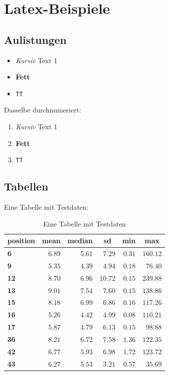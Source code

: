 
\chapter{Latex-Beispiele}
\label{chap:bsp}

\section{Aulistungen}

\begin{itemize}
	\item \textit{Kursiv} Text 1
	\item \textbf{Fett}  
	\item \texttt{TT} 
	\end{itemize}
	
	Dasselbe durchnumeriert:
	
	\begin{enumerate}
		\item \textit{Kursiv} Text 1
		\item \textbf{Fett}  
		\item \texttt{TT} 
	\end{enumerate}


\section{Tabellen}

Eine Tabelle mit Testdaten:


\begin{table}[H]
	\begin{center}
		\begin{tabular}{lrrrrr}\hline\hline
			\multicolumn{1}{l}{\textbf{position}}&
			\multicolumn{1}{c}{\textbf{mean}}&
			\multicolumn{1}{c}{\textbf{median}}&
			\multicolumn{1}{c}{\textbf{sd}}&
			\multicolumn{1}{c}{\textbf{min}}&
			\multicolumn{1}{c}{\textbf{max}}
			\\ \hline
			\textbf{6}&$6.89$&$5.61$&$ 7.29$&$0.31$&$160.12$\\
			\textbf{9}&$5.35$&$4.39$&$ 4.94$&$0.18$&$ 76.40$\\
			\textbf{12}&$8.70$&$6.96$&$10.72$&$0.15$&$239.88$\\
			\textbf{13}&$9.01$&$7.54$&$ 7.60$&$0.15$&$138.86$\\
			\textbf{15}&$8.18$&$6.99$&$ 6.86$&$0.16$&$117.26$\\
			\textbf{16}&$5.26$&$4.42$&$ 4.99$&$0.08$&$110.21$\\
			\textbf{17}&$5.87$&$4.79$&$ 6.13$&$0.15$&$ 98.88$\\
			\textbf{36}&$8.21$&$6.72$&$ 7.58$&$1.36$&$122.35$\\
			\textbf{42}&$6.77$&$5.93$&$ 6.98$&$1.72$&$123.72$\\
			\textbf{43}&$6.27$&$5.53$&$ 3.21$&$0.57$&$ 35.69$\\
			\hline
		\end{tabular}
	\end{center}
	\caption{Eine Tabelle mit Testdaten} 
	\label{tabelle:test}
\end{table}

